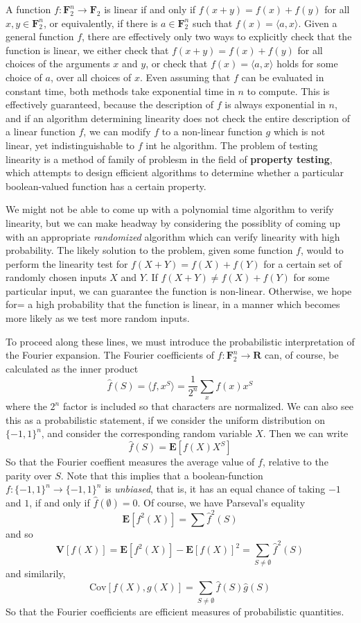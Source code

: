 A function $f: \mathbf{F}_2^n \to \mathbf{F}_2$ is linear if and only if $f(x + y) = f(x) + f(y)$ for all $x,y \in \mathbf{F}_2^n$, or equivalently, if there is $a \in \mathbf{F}_2^n$ such that $f(x) = \langle a, x \rangle$. Given a general function $f$, there are effectively only two ways to explicitly check that the function is linear, we either check that $f(x + y) = f(x) + f(y)$ for all choices of the arguments $x$ and $y$, or check that $f(x) = \langle a, x \rangle$ holds for some choice of $a$, over all choices of $x$. Even assuming that $f$ can be evaluated in constant time, both methods take exponential time in $n$ to compute. This is effectively guaranteed, because the description of $f$ is always exponential in $n$, and if an algorithm determining linearity does not check the entire description of a linear function $f$, we can modify $f$ to a non-linear function $g$ which is not linear, yet indistinguishable to $f$ int he algorithm. The problem of testing linearity is a method of family of problesm in the field of {\bf property testing}, which attempts to design efficient algorithms to determine whether a particular boolean-valued function has a certain property.

We might not be able to come up with a polynomial time algorithm to verify linearity, but we can make headway by considering the possiblity of coming up with an appropriate {\it randomized} algorithm which can verify linearity with high probability. The likely solution to the problem, given some function $f$, would to perform the linearity test for $f(X + Y) = f(X) + f(Y)$ for a certain set of randomly chosen inputs $X$ and $Y$. If $f(X + Y) \neq f(X) + f(Y)$ for some particular input, we can guarantee the function is non-linear. Otherwise, we hope for= a high probability that the function is linear, in a manner which becomes more likely as we test more random inputs.

To proceed along these lines, we must introduce the probabilistic interpretation of the Fourier expansion. The Fourier coefficients of $f: \mathbf{F}_2^n \to \mathbf{R}$ can, of course, be calculated as the inner product
%
\[ \widehat{f}(S) = \langle f, x^S \rangle = \frac{1}{2^n} \sum_x f(x) x^S \]
%
where the $2^n$ factor is included so that characters are normalized. We can also see this as a probabilistic statement, if we consider the uniform distribution on $\{ -1, 1 \}^n$, and consider the corresponding random variable $X$. Then we can write
%
\[ \widehat{f}(S) = \mathbf{E}[f(X) X^S] \]
%
So that the Fourier coeffient measures the average value of $f$, relative to the parity over $S$. Note that this implies that a boolean-function $f: \{ -1, 1 \}^n \to \{ -1, 1 \}^n$ is {\it unbiased}, that is, it has an equal chance of taking $-1$ and $1$, if and only if $\widehat{f}(\emptyset) = 0$. Of course, we have Parseval's equality
%
\[ \mathbf{E}[f^2(X)] = \sum \widehat{f}^2(S) \]
%
and so
%
\[ \mathbf{V}[f(X)] = \mathbf{E}[f^2(X)] - \mathbf{E}[f(X)]^2 = \sum_{S \neq \emptyset} \widehat{f}^2(S) \]
%
and similarily,
%
\[ \text{Cov}[f(X),g(X)] = \sum_{S \neq \emptyset} \widehat{f}(S) \widehat{g}(S) \]
%
So that the Fourier coefficients are efficient measures of probabilistic quantities.

